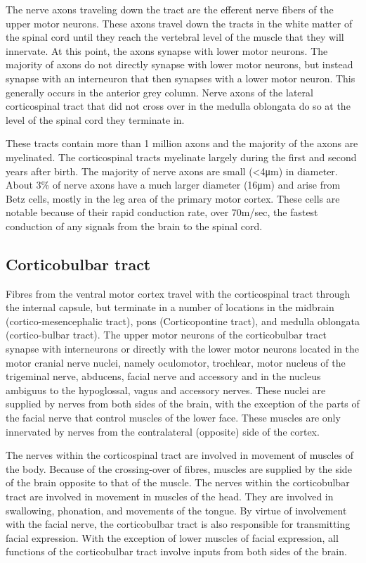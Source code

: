 \documentclass[]{book}
\begin{document}
The nerve axons traveling down the tract are the efferent nerve fibers of the upper motor neurons. These axons travel down the tracts in the white matter of the spinal cord until they reach the vertebral level of the muscle that they will innervate. At this point, the axons synapse with lower motor neurons. The majority of axons do not directly synapse with lower motor neurons, but instead synapse with an interneuron that then synapses with a lower motor neuron. This generally occurs in the anterior grey column. Nerve axons of the lateral corticospinal tract that did not cross over in the medulla oblongata do so at the level of the spinal cord they terminate in.

These tracts contain more than 1 million axons and the majority of the axons are myelinated. The corticospinal tracts myelinate largely during the first and second years after birth. The majority of nerve axons are small (\textless{}4μm) in diameter. About 3\% of nerve axons have a much larger diameter (16μm) and arise from Betz cells, mostly in the leg area of the primary motor cortex. These cells are notable because of their rapid conduction rate, over 70m/sec, the fastest conduction of any signals from the brain to the spinal cord.

\hypertarget{corticobulbar-tract}{%
\subsection{Corticobulbar tract}\label{corticobulbar-tract}}

Fibres from the ventral motor cortex travel with the corticospinal tract through the internal capsule, but terminate in a number of locations in the midbrain (cortico-mesencephalic tract), pons (Corticopontine tract), and medulla oblongata (cortico-bulbar tract). The upper motor neurons of the corticobulbar tract synapse with interneurons or directly with the lower motor neurons located in the motor cranial nerve nuclei, namely oculomotor, trochlear, motor nucleus of the trigeminal nerve, abducens, facial nerve and accessory and in the nucleus ambiguus to the hypoglossal, vagus and accessory nerves. These nuclei are supplied by nerves from both sides of the brain, with the exception of the parts of the facial nerve that control muscles of the lower face. These muscles are only innervated by nerves from the contralateral (opposite) side of the cortex.

The nerves within the corticospinal tract are involved in movement of muscles of the body. Because of the crossing-over of fibres, muscles are supplied by the side of the brain opposite to that of the muscle. The nerves within the corticobulbar tract are involved in movement in muscles of the head. They are involved in swallowing, phonation, and movements of the tongue. By virtue of involvement with the facial nerve, the corticobulbar tract is also responsible for transmitting facial expression. With the exception of lower muscles of facial expression, all functions of the corticobulbar tract involve inputs from both sides of the brain.
\end{document}

